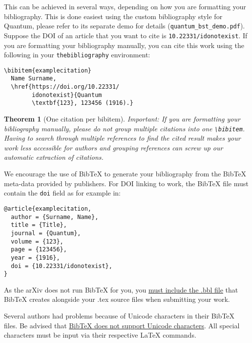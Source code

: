\documentclass[a4paper,twocolumn,11pt,accepted=2017-05-09]{quantumarticle}
\newtheorem{theorem}{Theorem}
\begin{document}
This can be achieved in several ways, depending on how you are formatting your bibliography.
This is done easiest using the custom bibliography style for Quantum,
please refer to its separate demo for details (\texttt{quantum\_bst\_demo.pdf}).
Suppose the DOI of an article \cite{examplecitation} that you want to cite is \texttt{10.22331/idonotexist}.
If you are formatting your bibliography manually, you can cite this work using the following in your \texttt{thebibliography} environment:
\begin{verbatim}
\bibitem{examplecitation}
  Name Surname,
  \href{https://doi.org/10.22331/
        idonotexist}{Quantum
        \textbf{123}, 123456 (1916).}
\end{verbatim}

\begin{theorem}[One citation per bibitem]
  Important: If you are formatting your bibliography manually, please do not group multiple citations into one \texttt{\textbackslash{}bibitem}.
  Having to search through multiple references to find the cited result makes your work less accessible for authors and grouping references can screw up our automatic extraction of citations.
\end{theorem}

We encourage the use of BibTeX to generate your bibliography from the BibTeX meta-data provided by publishers.
For DOI linking to work, the BibTeX file must contain the \texttt{doi} field as for example in:
\begin{verbatim}
@article{examplecitation,
  author = {Surname, Name},
  title = {Title},
  journal = {Quantum},
  volume = {123},
  page = {123456},
  year = {1916},
  doi = {10.22331/idonotexist},
}
\end{verbatim}
As the arXiv does not run BibTeX for you, you \href{https://arxiv.org/help/submit_tex}{must include the .bbl file} that BibTeX creates alongside your .tex source files when submitting your work.

Several authors had problems because of Unicode characters in their BibTeX files.
Be advised that \href{http://wiki.lyx.org/BibTeX/Tips}{BibTeX does not support Unicode characters}.
All special characters must be input via their respective LaTeX commands.
\end{document}
